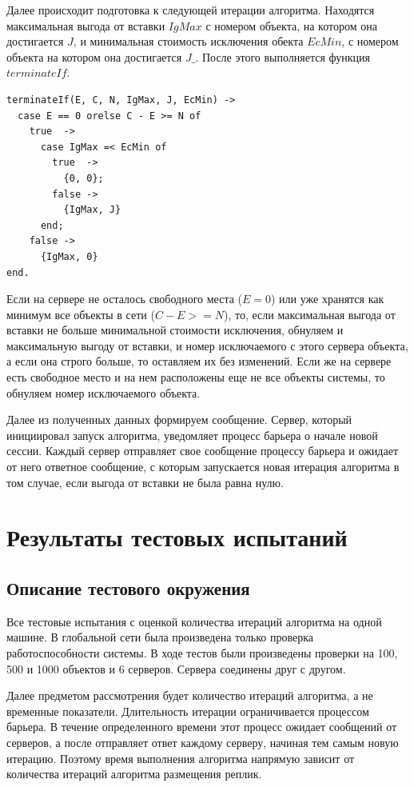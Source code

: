 			Далее происходит подготовка к следующей итерации алгоритма. Находятся максимальная выгода от вставки $IgMax$ с номером объекта, на котором она достигается $J$, и минимальная стоимость 
			исключения обекта $EcMin$, с номером объекта на котором она достигается $J\_$. После этого выполняется функция $terminateIf$.
			\begin{lstlisting}
terminateIf(E, C, N, IgMax, J, EcMin) ->
  case E == 0 orelse C - E >= N of
    true  -> 
      case IgMax =< EcMin of
        true  -> 
          {0, 0};
        false -> 
          {IgMax, J}
      end;
    false -> 
      {IgMax, 0}
end.	
			\end{lstlisting}
			Если на сервере не осталось свободного места ($E = 0$) или уже хранятся как минимум все объекты в сети ($C - E >= N$), то, если максимальная выгода от вставки не больше минимальной 
			стоимости исключения, обнуляем и максимальную выгоду от вставки, и номер исключаемого с этого сервера объекта, а если она строго больше, то оставляем их без изменений.
			Если же на сервере есть свободное место и на нем расположены еще не все объекты системы, то обнуляем номер исключаемого объекта. 
			
			Далее из полученных данных формируем сообщение. Сервер, который инициировал запуск алгоритма, уведомляет процесс барьера о начале новой сессии. Каждый сервер отправляет свое
			сообщение процессу барьера  и ожидает от него ответное сообщение, с которым запускается новая итерация алгоритма в том случае, если выгода от вставки не была равна нулю.


			
\chapter{Результаты тестовых испытаний}
	\section{Описание тестового окружения}
		Все тестовые испытания с оценкой количества итераций алгоритма на одной машине. В глобальной сети была произведена только проверка работоспособности системы. В ходе тестов были 
		произведены проверки на 100, 500 и 1000 объектов и 6 серверов. Сервера соединены друг с другом. 

		Далее предметом рассмотрения будет количество итераций алгоритма, а не временные показатели. Длительность итерации ограничивается процессом барьера. В течение определенного времени
		этот процесс ожидает сообщений от серверов, а после отправляет ответ каждому серверу, начиная тем самым новую итерацию. Поэтому время выполнения алгоритма напрямую зависит от 
		количества итераций алгоритма размещения реплик.
		
